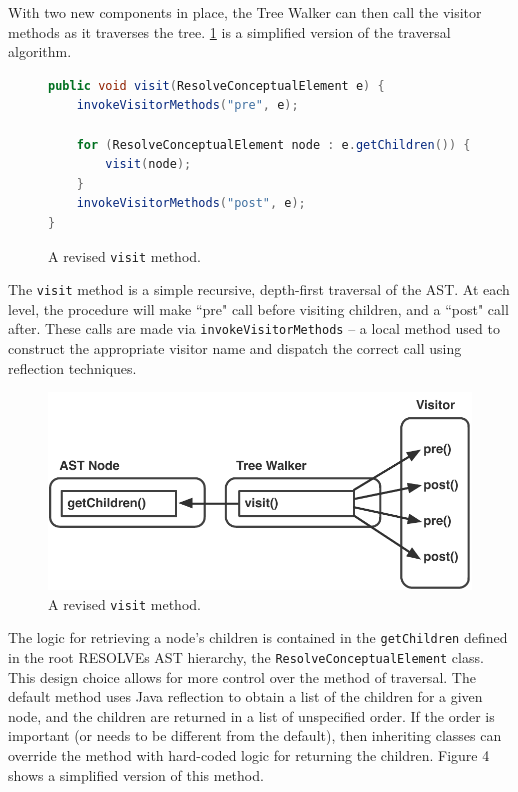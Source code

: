 \documentclass[times]{speauth}
\begin{document}
With two new components in place, the Tree Walker can then call the visitor methods as it traverses the tree. \ref{fig:newvisit} is a simplified version of the traversal algorithm.

\begin{figure}[!htb]
\centering
\begin{minipage}{.80\textwidth}
\begin{lstlisting}[language=java]
public void visit(ResolveConceptualElement e) {
    invokeVisitorMethods("pre", e);
    
    for (ResolveConceptualElement node : e.getChildren()) {
        visit(node);
    }
    invokeVisitorMethods("post", e);
}
\end{lstlisting}
\end{minipage}
\caption{A revised \texttt{visit} method.}
\label{fig:newvisit}
\end{figure}

The \texttt{visit} method is a simple recursive, depth-first traversal of the AST. At each level, the procedure will make ``pre" call before visiting children, and a ``post" call after. These calls are made via \texttt{invokeVisitorMethods} -- a local method used to construct the appropriate visitor name and dispatch the correct call using reflection techniques.

\begin{figure}[!htb]
\centering
\includegraphics[scale=.60]{figures/prepostprepost.pdf}
\caption{A revised \texttt{visit} method.}
\end{figure}

The logic for retrieving a node's children is contained in the \texttt{getChildren} defined in the root RESOLVEs AST hierarchy, the \texttt{ResolveConceptualElement} class. This design choice allows for more control over the method of traversal. The default method uses Java reflection to obtain a list of the children for a given node, and the children are returned in a list of unspecified order. If the order is important (or needs to be different from the default), then inheriting classes can override the method with hard-coded logic for returning the children. Figure 4 shows a simplified version of this method.
\end{document}
